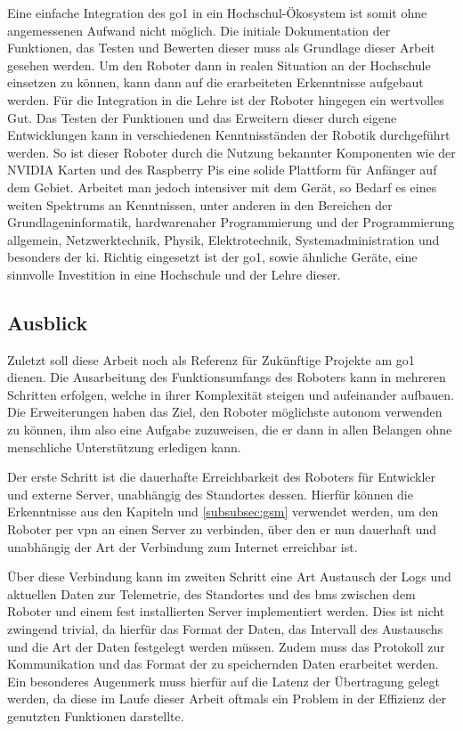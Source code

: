 Eine einfache Integration des \gls{go1} in ein Hochschul-Ökosystem ist somit ohne angemessenen Aufwand nicht möglich.
Die initiale Dokumentation der Funktionen, das Testen und Bewerten dieser muss als Grundlage dieser Arbeit gesehen werden.
Um den Roboter dann in realen Situation an der Hochschule einsetzen zu können, kann dann auf die erarbeiteten Erkenntnisse
aufgebaut werden.
Für die Integration in die Lehre ist der Roboter hingegen ein wertvolles Gut.
Das Testen der Funktionen und das Erweitern dieser durch eigene Entwicklungen kann in verschiedenen Kenntnisständen der
Robotik durchgeführt werden.
So ist dieser Roboter durch die Nutzung bekannter Komponenten wie der NVIDIA Karten und des Raspberry Pis eine solide Plattform
für Anfänger auf dem Gebiet.
Arbeitet man jedoch intensiver mit dem Gerät, so Bedarf es eines weiten Spektrums an Kenntnissen, unter anderen in den Bereichen
der Grundlageninformatik, hardwarenaher Programmierung und der Programmierung allgemein, Netzwerktechnik, Physik, Elektrotechnik,
Systemadministration und besonders der \gls{ki}.
Richtig eingesetzt ist der \gls{go1}, sowie ähnliche Geräte, eine sinnvolle Investition in eine Hochschule und der Lehre dieser.


\subsection{Ausblick}
\label{subsec:ausblick}

Zuletzt soll diese Arbeit noch als Referenz für Zukünftige Projekte am \gls{go1} dienen.
Die Ausarbeitung des Funktionsumfangs des Roboters kann in mehreren Schritten erfolgen, welche in ihrer Komplexität
steigen und aufeinander aufbauen.
Die Erweiterungen haben das Ziel, den Roboter möglichste autonom verwenden zu können, ihm also eine Aufgabe zuzuweisen,
die er dann in allen Belangen ohne menschliche Unterstützung erledigen kann.

Der erste Schritt ist die dauerhafte Erreichbarkeit des Roboters für Entwickler und externe Server, unabhängig des Standortes
dessen.
Hierfür können die Erkenntnisse aus den Kapiteln  und \ref{subsubsec:gsm} verwendet werden, um
den Roboter per \gls{vpn} an einen Server zu verbinden, über den er nun dauerhaft und unabhängig der Art der Verbindung zum Internet
erreichbar ist.

Über diese Verbindung kann im zweiten Schritt eine Art Austausch der Logs und aktuellen Daten zur Telemetrie, des Standortes und
des \gls{bms} zwischen dem Roboter und einem fest installierten Server implementiert werden.
Dies ist nicht zwingend trivial, da hierfür das Format der Daten, das Intervall des Austauschs und die Art der Daten festgelegt werden
müssen.
Zudem muss das Protokoll zur Kommunikation und das Format der zu speichernden Daten erarbeitet werden.
Ein besonderes Augenmerk muss hierfür auf die Latenz der Übertragung gelegt werden, da diese im Laufe dieser Arbeit
oftmals ein Problem in der Effizienz der genutzten Funktionen darstellte.

